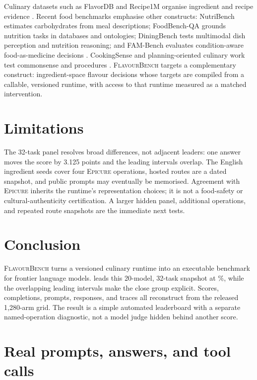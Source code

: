 \documentclass{article}
\newcommand{\system}{\textsc{FlavourBench}}
\newcommand{\epicure}{\textsc{Epicure}}
\begin{document}
Culinary datasets such as FlavorDB and Recipe1M organise ingredient and recipe evidence
\cite{garg2018flavordb,salvador2017recipe1m}. Recent food benchmarks emphasise other constructs:
NutriBench estimates carbohydrates from meal descriptions; FoodBench-QA grounds nutrition tasks in
databases and ontologies; DiningBench tests multimodal dish perception and nutrition reasoning; and
FAM-Bench evaluates condition-aware food-as-medicine decisions
\cite{hua2025nutribench,eftimov2026foodbench,jin2026diningbench,mao2026fambench}. CookingSense and
planning-oriented culinary work test commonsense and procedures
\cite{choi2024cookingsense,wu2025recipe2plan}. \system{} targets a complementary construct:
ingredient-space flavour decisions whose targets are compiled from a callable, versioned runtime,
with access to that runtime measured as a matched intervention.

\section{Limitations}

The 32-task panel resolves broad differences, not adjacent leaders: one answer moves the score by
3.125 points and the leading intervals overlap. The English ingredient seeds cover four
\epicure{} operations, hosted routes are a dated snapshot, and public prompts may eventually be
memorised. Agreement with \epicure{} inherits the runtime's representation choices; it is not a
food-safety or cultural-authenticity certification. A larger hidden panel, additional operations,
and repeated route snapshots are the immediate next tests.

\section{Conclusion}

\system{} turns a versioned culinary runtime into an executable benchmark for frontier language
models. \FBTopModel{} leads this 20-model, 32-task snapshot at \FBTopScore{}\%, while the overlapping
leading intervals make the close group explicit. Scores, completions, prompts, responses, and
traces all reconstruct from the released 1,280-arm grid. The result is a simple automated
leaderboard with a separate named-operation diagnostic, not a model judge hidden behind another
score.

\clearpage
\appendix

\section{Real prompts, answers, and tool calls}
\label{sec:cases}
\end{document}
